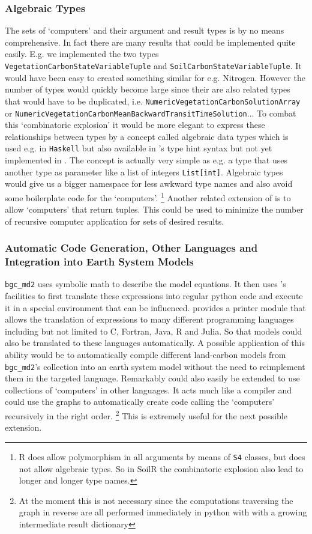 \subsubsection{Algebraic Types}
The sets of `computers' and their argument and result types is by no means comprehensive.
In fact there are many results that could be implemented quite easily. 
E.g. we implemented the two types \texttt{VegetationCarbonStateVariableTuple} and 
\texttt{SoilCarbonStateVariableTuple}. It would have been easy to created something similar for e.g. Nitrogen. However the number of types would quickly become large since their
are also related types that would have to be duplicated, i.e. \texttt{NumericVegetationCarbonSolutionArray} or \texttt{NumericVegetationCarbonMeanBackwardTransitTimeSolution}...
To combat this `combinatoric explosion' it would be more elegant to express these relationships between types by a concept called
algebraic data types which is used e.g. in  \texttt{Haskell} but also available in \python{} 's type hint syntax but not yet implemented in \ComputabilityGraphs{}.
The concept is actually very simple as e.g. a type that uses another type as parameter like a list of integers \texttt{List[int]}. Algebraic types would give us a bigger namespace 
for less awkward type names and also avoid some boilerplate code for the `computers'.
\footnote{R does allow polymorphism in all arguments by means of \texttt{S4} classes, but does not allow algebraic types. So in SoilR the combinatoric explosion also lead to longer and longer type names.
}
Another related extension of \ComputabilityGraphs{} is to allow `computers' that return tuples. 
This could be used to minimize the number of recursive computer application for sets of desired results.   

\subsubsection{Automatic Code Generation, Other Languages and Integration into Earth System Models}
\texttt{bgc\_md2} uses symbolic math to describe the model equations. It then
uses \sympy{}'s facilities to first translate these expressions into regular python code and execute it in a special environment that can be influenced.
\sympy{}
provides a printer module that allows the translation of \sympy{} 
expressions to many different programming languages including but not limited to C, Fortran, Java, R and Julia.
So that models could also be translated to these languages automatically. 
A possible application of this ability would be to automatically compile different land-carbon models from \texttt{bgc\_md2}'s collection into an earth system model without the need to reimplement them in the targeted language. 
Remarkably \ComputabilityGraphs could also easily be extended to use collections of `computers' in other languages. 
It acts much like a compiler and could use the graphs to automatically create code calling the `computers' recursively in the right order. 
\footnote{At the moment this is not necessary since the computations traversing the graph in reverse are all performed immediately in python with with a growing intermediate result dictionary}  
This is extremely useful for the next possible extension.

